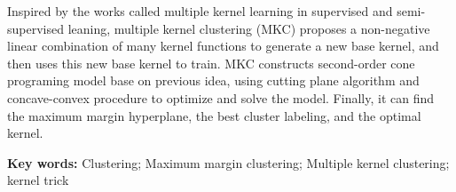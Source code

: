 Inspired by the works called multiple kernel learning in supervised and semi-supervised leaning, multiple kernel clustering (MKC) proposes a non-negative linear combination of many kernel functions to generate a new base kernel, and then uses this new base kernel to train. MKC constructs second-order cone programing model base on previous idea, using cutting plane algorithm and concave-convex procedure to optimize and solve the model. Finally, it can find the maximum margin hyperplane, the best cluster labeling, and the optimal kernel. 

\textbf{Key words:} Clustering; Maximum margin clustering; Multiple kernel clustering; kernel trick